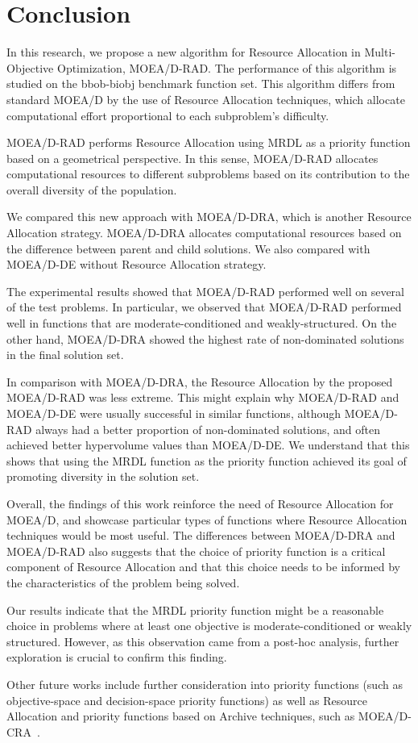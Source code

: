 \section{Conclusion}

In this research, we propose a new algorithm for Resource Allocation in
Multi-Objective Optimization, MOEA/D-RAD. The performance of this algorithm is
studied on the bbob-biobj benchmark function set. This algorithm differs from
standard MOEA/D by the use of Resource Allocation techniques, which allocate
computational effort proportional to each subproblem's difficulty.

MOEA/D-RAD performs Resource Allocation using MRDL as a priority function based
on a geometrical perspective. In this sense, MOEA/D-RAD allocates computational
resources to different subproblems based on its contribution to the overall
diversity of the population.

We compared this new approach with MOEA/D-DRA, which is another
Resource Allocation strategy. MOEA/D-DRA allocates computational resources
based on the difference between parent and child solutions. We also compared
with MOEA/D-DE without Resource Allocation strategy.

The experimental results showed that MOEA/D-RAD performed well on several  of
the test problems. In particular, we observed that MOEA/D-RAD performed well in
functions that are moderate-conditioned and weakly-structured.  On the other
hand, MOEA/D-DRA showed the highest rate of non-dominated  solutions in the
final solution set.

In comparison with MOEA/D-DRA, the Resource Allocation by the proposed
MOEA/D-RAD was less extreme. This might explain why MOEA/D-RAD and MOEA/D-DE
were usually successful in similar functions, although MOEA/D-RAD always  had a
better proportion of non-dominated solutions, and often achieved better
hypervolume values than MOEA/D-DE. We understand that this shows that using the
MRDL function as the priority function achieved its goal of promoting diversity
in the solution set.

Overall, the findings of this work reinforce the need of Resource Allocation for
MOEA/D, and showcase particular types of functions where Resource Allocation
techniques would be most useful. The differences between MOEA/D-DRA and
MOEA/D-RAD also  suggests that the choice of priority function is a critical
component of Resource Allocation and that this choice needs to be informed by
the characteristics of the problem being solved.

Our results indicate that the MRDL priority function might be a reasonable
choice in problems where at least one objective is moderate-conditioned or
weakly structured. However, as this observation came from a post-hoc analysis,
further exploration is crucial to confirm this finding.

Other future works include further consideration into priority functions  (such
as objective-space and decision-space priority functions) as well as  Resource
Allocation and priority functions based on Archive techniques,  such as
MOEA/D-CRA~\cite{kang2018collaborative}.
